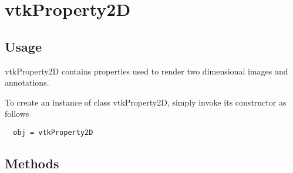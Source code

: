 \section{vtkProperty2D}

\subsection{Usage}

 vtkProperty2D contains properties used to render two dimensional images
 and annotations.

To create an instance of class vtkProperty2D, simply
invoke its constructor as follows
\begin{verbatim}
  obj = vtkProperty2D
\end{verbatim}
\subsection{Methods}

